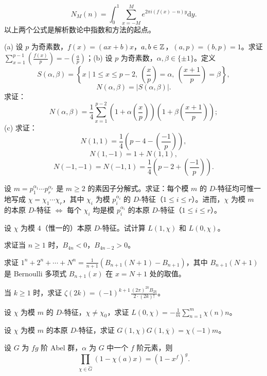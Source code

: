 \begin{Exercises}
  \[
    N_M(n)=\int_0^1\sum_{x=-M}^{M}e^{2\pi i(f(x)-n)y}\mathrm{d}y.
  \]
  以上两个公式是解析数论中指数和方法的起点。
  \item (a) 设 $p$ 为奇素数，$f(x)=(ax+b)x$，$a,b\in\mathbb{Z}$，$(a,p)=(b,p)=1$。求证 $\sum_{x=1}^{p-1}\left(\frac{f(x)}{p}\right)=-\left(\frac{a}{p}\right)$；(b) 设 $p$ 为奇素数，$\alpha,\beta\in\{\pm1\}$。定义
  \[
    S(\alpha,\beta)=\left\{x\mid 1\leqslant x\leqslant p-2,\ \left(\frac{x}{p}\right)=\alpha,\ \left(\frac{x+1}{p}\right)=\beta\right\},
  \]
  \[
    N(\alpha,\beta)=|S(\alpha,\beta)|.
  \]
  求证：
  \[
    N(\alpha,\beta)=\frac{1}{4}\sum_{x=1}^{p-2}\left(1+\alpha\left(\frac{x}{p}\right)\right)\left(1+\beta\left(\frac{x+1}{p}\right)\right);
  \]
  (c) 求证：
  \[
    N(1,1)=\frac{1}{4}\left(p-4-\left(\frac{-1}{p}\right)\right),
  \]
  \[
    N(1,-1)=1+N(1,1),
  \]
  \[
    N(-1,-1)=N(-1,1)=\frac{1}{4}\left(p-2+\left(\frac{-1}{p}\right)\right).
  \]
  \item 设 $m=p_1^{\alpha_1}\cdots p_r^{\alpha_r}$ 是 $m\geqslant 2$ 的素因子分解式。求证：每个模 $m$ 的 $D$-特征均可惟一地写成 $\chi=\chi_1\cdots\chi_r$，其中 $\chi_i$ 为模 $p_i^{\alpha_i}$ 的 $D$-特征（$1\leqslant i\leqslant r$）。进而，$\chi$ 为模 $m$ 的本原 $D$-特征 $\Leftrightarrow$ 每个 $\chi_i$ 均是模 $p_i^{\alpha_i}$ 的本原 $D$-特征（$1\leqslant i\leqslant r$）。
  \item 设 $\chi$ 为模 $4$（惟一的）本原 $D$-特征。试计算 $L(1,\chi)$ 和 $L(0,\chi)$。
  \item 求证当 $n\geqslant 1$ 时，$B_{4n}<0$，$B_{4n-2}>0$。
  \item 求证 $1^n+2^n+\cdots+N^n=\frac{1}{n+1}(B_{n+1}(N+1)-B_{n+1})$，其中 $B_{n+1}(N+1)$ 是 Bernoulli 多项式 $B_{n+1}(x)$ 在 $x=N+1$ 处的取值。
  \item 当 $k\geqslant 1$ 时，求证 $\zeta(2k)=(-1)^{k+1}\frac{(2\pi)^{2k}B_{2k}}{2\cdot(2k)!}$。
  \item 设 $\chi$ 为模 $m$ 的 $D$-特征，$\chi\neq\chi_0$，求证 $L(0,\chi)=-\frac{1}{m}\sum_{n=1}^{m}\chi(n)n$。
  \item 设 $\chi$ 为模 $m$ 的本原 $D$-特征，求证 $G(1,\chi)G(1,\overline{\chi})=\chi(-1)m$。
  \item 设 $G$ 为 $fg$ 阶 Abel 群，$\alpha$ 为 $G$ 中一个 $f$ 阶元素，则
  \[
    \prod_{\chi\in\widehat{G}}(1-\chi(a)x)=(1-x^f)^g.
  \]
\end{Exercises}
